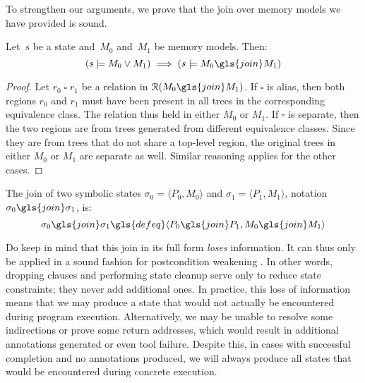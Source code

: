 To strengthen our arguments, we prove that the join over memory models we have provided is sound.
\begin{lemma}\label{lem:mem_soundness}
  Let~$s$ be a state and~$M_0$ and~$M_1$ be memory models. Then:
  \begin{equation*}
    (s\models M_0 \vee M_1) \implies (s\models M_0\gls{join}M_1)
  \end{equation*}
\end{lemma}
\begin{proof}
  Let $r_0\mathbin{\square}r_1$ be a relation in $\mathcal{R}(M_0\gls{join}M_1)$.
  If $\square$ is \gls{alias}, then both regions $r_0$ and $r_1$ must have been present in all trees in the corresponding equivalence class.
  The relation thus held in either $M_0$ or $M_1$.
  If $\square$ is \gls{separate}, then the two regions are from trees generated from different equivalence classes. Since they are from trees that do not share a top-level region, the original trees in either $M_0$ or $M_1$ are separate as well.
  Similar reasoning applies for the other cases.
\end{proof}

\begin{definition}
  The join of two symbolic states $\sigma_0=\langle P_0,M_0\rangle$
  and $\sigma_1=\langle P_1,M_1\rangle$, notation $\sigma_0\gls{join}\sigma_1$, is:
  \begin{equation*}
    \sigma_0\gls{join}\sigma_1\gls{defeq}\langle P_0\gls{join}P_1,M_0\gls{join}M_1\rangle
  \end{equation*}
\end{definition}

Do keep in mind that this join in its full form \emph{loses} information.
It can thus only be applied in a sound fashion for postcondition weakening \autocite{hoare1969axiomatic}.
In other words, dropping clauses and performing state cleanup
serve only to reduce state constraints; they never add additional ones.
In practice, this loss of information means that we may produce a state
that would not actually be encountered during program execution.
Alternatively, we may be unable to resolve some indirections or prove some return addresses, which would result in additional annotations generated or even tool failure.
Despite this, in cases with successful completion and no annotations produced,
we will always produce all states that would be encountered during concrete execution.

